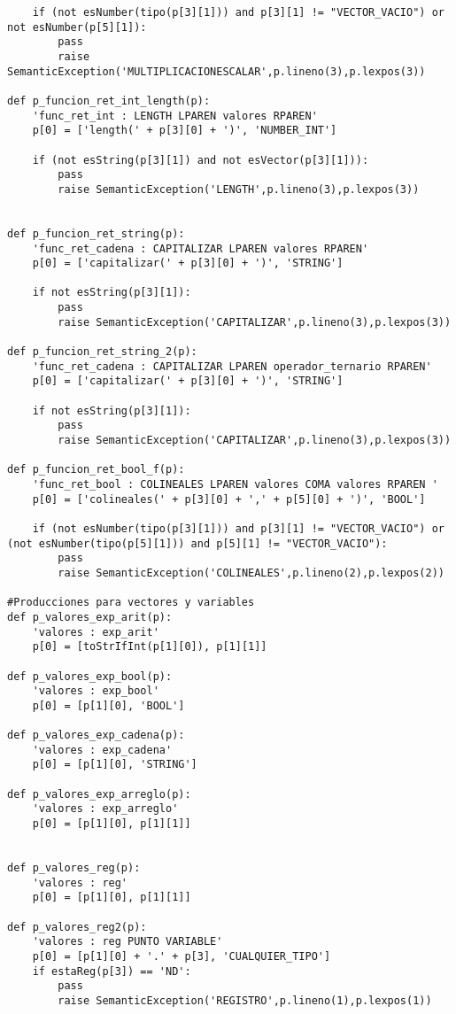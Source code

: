 \begin{verbatim}
    if (not esNumber(tipo(p[3][1])) and p[3][1] != "VECTOR_VACIO") or not esNumber(p[5][1]):
        pass
        raise SemanticException('MULTIPLICACIONESCALAR',p.lineno(3),p.lexpos(3))

def p_funcion_ret_int_length(p):
    'func_ret_int : LENGTH LPAREN valores RPAREN'
    p[0] = ['length(' + p[3][0] + ')', 'NUMBER_INT']

    if (not esString(p[3][1]) and not esVector(p[3][1])):
        pass
        raise SemanticException('LENGTH',p.lineno(3),p.lexpos(3))


def p_funcion_ret_string(p):
    'func_ret_cadena : CAPITALIZAR LPAREN valores RPAREN'
    p[0] = ['capitalizar(' + p[3][0] + ')', 'STRING']

    if not esString(p[3][1]):
        pass
        raise SemanticException('CAPITALIZAR',p.lineno(3),p.lexpos(3))
      
def p_funcion_ret_string_2(p):
    'func_ret_cadena : CAPITALIZAR LPAREN operador_ternario RPAREN'
    p[0] = ['capitalizar(' + p[3][0] + ')', 'STRING']

    if not esString(p[3][1]):
        pass
        raise SemanticException('CAPITALIZAR',p.lineno(3),p.lexpos(3))

def p_funcion_ret_bool_f(p):
    'func_ret_bool : COLINEALES LPAREN valores COMA valores RPAREN '
    p[0] = ['colineales(' + p[3][0] + ',' + p[5][0] + ')', 'BOOL']

    if (not esNumber(tipo(p[3][1])) and p[3][1] != "VECTOR_VACIO") or (not esNumber(tipo(p[5][1])) and p[5][1] != "VECTOR_VACIO"):
        pass
        raise SemanticException('COLINEALES',p.lineno(2),p.lexpos(2))

#Producciones para vectores y variables
def p_valores_exp_arit(p):
    'valores : exp_arit'
    p[0] = [toStrIfInt(p[1][0]), p[1][1]]

def p_valores_exp_bool(p):
    'valores : exp_bool'
    p[0] = [p[1][0], 'BOOL']

def p_valores_exp_cadena(p):
    'valores : exp_cadena'
    p[0] = [p[1][0], 'STRING']

def p_valores_exp_arreglo(p):
    'valores : exp_arreglo'
    p[0] = [p[1][0], p[1][1]]


def p_valores_reg(p):
    'valores : reg'
    p[0] = [p[1][0], p[1][1]]

def p_valores_reg2(p):
    'valores : reg PUNTO VARIABLE'
    p[0] = [p[1][0] + '.' + p[3], 'CUALQUIER_TIPO']
    if estaReg(p[3]) == 'ND':
        pass
        raise SemanticException('REGISTRO',p.lineno(1),p.lexpos(1))


\end{verbatim}
